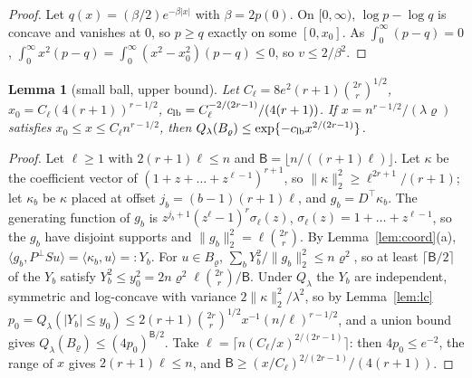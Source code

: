 \documentclass[11pt]{article}
\newtheorem{lemma}{Lemma}
\theoremstyle{definition}
\theoremstyle{remark}
\newcommand{\Ql}{Q_\lambda}
\newcommand{\Pp}{P^{\perp}}
\begin{document}
\begin{proof}
Let $q(x)=(\beta/2)e^{-\beta|x|}$ with $\beta=2p(0)$. On $[0,\infty)$, $\log p-\log q$ is concave and vanishes at $0$, so $p\ge q$ exactly on some $[0,x_0]$. As $\int_0^\infty(p-q)=0$, $\int_0^\infty x^2(p-q)=\int_0^\infty(x^2-x_0^2)(p-q)\le0$, so $v\le2/\beta^2$.
\end{proof}

\begin{lemma}[small ball, upper bound]\label{lem:sbu}
Let $C_\ell=8e^2(r+1)\binom{2r}r^{1/2}$, $x_0=C_\ell(4(r+1))^{r-1/2}$, $c_{\rm lb}=C_\ell^{-2/(2r-1)}/(4(r+1))$. If $x=n^{r-1/2}/(\lambda\varrho)$ satisfies $x_0\le x\le C_\ell n^{r-1/2}$, then $\Ql(B_\varrho)\le\exp\{-c_{\rm lb}x^{2/(2r-1)}\}$.
\end{lemma}

\begin{proof}
Let $\ell\ge1$ with $2(r+1)\ell\le n$ and $\mathsf B=\lfloor n/((r+1)\ell)\rfloor$. Let $\kappa$ be the coefficient vector of $(1+z+\dots+z^{\ell-1})^{r+1}$, so $\|\kappa\|_2^2\ge\ell^{2r+1}/(r+1)$; let $\kappa_b$ be $\kappa$ placed at offset $j_b=(b-1)(r+1)\ell$, and $g_b=D^\top\kappa_b$. The generating function of $g_b$ is $z^{j_b+1}(z^\ell-1)^r\sigma_\ell(z)$, $\sigma_\ell(z)=1+\dots+z^{\ell-1}$, so the $g_b$ have disjoint supports and $\|g_b\|_2^2=\ell\binom{2r}r$. By Lemma~\ref{lem:coord}(a), $\langle g_b,\Pp Su\rangle=\langle\kappa_b,u\rangle=:Y_b$. For $u\in B_\varrho$, $\sum_bY_b^2/\|g_b\|_2^2\le n\varrho^2$, so at least $\lceil\mathsf B/2\rceil$ of the $Y_b$ satisfy $Y_b^2\le y_0^2=2n\varrho^2\ell\binom{2r}r/\mathsf B$. Under $\Ql$ the $Y_b$ are independent, symmetric and log-concave with variance $2\|\kappa\|_2^2/\lambda^2$, so by Lemma~\ref{lem:lc}
$p_0=\Ql(|Y_b|\le y_0)\le2(r+1)\binom{2r}r^{1/2}x^{-1}(n/\ell)^{r-1/2}$,
and a union bound gives $\Ql(B_\varrho)\le(4p_0)^{\mathsf B/2}$. Take $\ell=\lceil n(C_\ell/x)^{2/(2r-1)}\rceil$: then $4p_0\le e^{-2}$, the range of $x$ gives $2(r+1)\ell\le n$, and $\mathsf B\ge(x/C_\ell)^{2/(2r-1)}/(4(r+1))$.
\end{proof}
\end{document}
